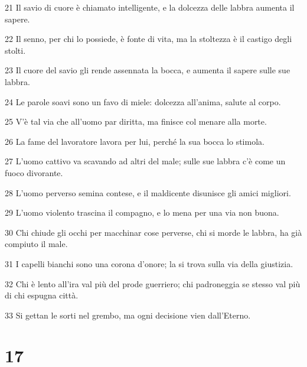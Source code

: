 \par 21 Il savio di cuore è chiamato intelligente, e la dolcezza delle labbra aumenta il sapere.
\par 22 Il senno, per chi lo possiede, è fonte di vita, ma la stoltezza è il castigo degli stolti.
\par 23 Il cuore del savio gli rende assennata la bocca, e aumenta il sapere sulle sue labbra.
\par 24 Le parole soavi sono un favo di miele: dolcezza all'anima, salute al corpo.
\par 25 V'è tal via che all'uomo par diritta, ma finisce col menare alla morte.
\par 26 La fame del lavoratore lavora per lui, perché la sua bocca lo stimola.
\par 27 L'uomo cattivo va scavando ad altri del male; sulle sue labbra c'è come un fuoco divorante.
\par 28 L'uomo perverso semina contese, e il maldicente disunisce gli amici migliori.
\par 29 L'uomo violento trascina il compagno, e lo mena per una via non buona.
\par 30 Chi chiude gli occhi per macchinar cose perverse, chi si morde le labbra, ha già compiuto il male.
\par 31 I capelli bianchi sono una corona d'onore; la si trova sulla via della giustizia.
\par 32 Chi è lento all'ira val più del prode guerriero; chi padroneggia se stesso val più di chi espugna città.
\par 33 Si gettan le sorti nel grembo, ma ogni decisione vien dall'Eterno.

\chapter{17}

